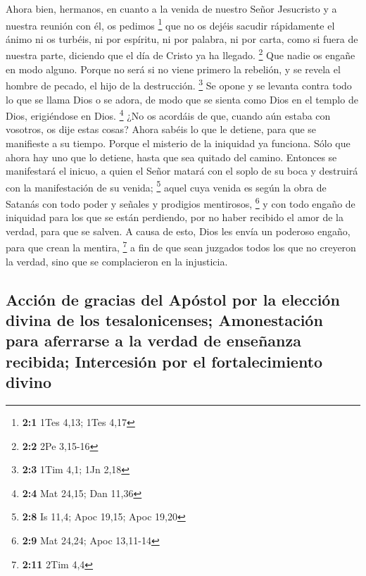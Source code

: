 \begin{paracol}{2}
 Ahora bien, hermanos, en cuanto a la venida de nuestro
Señor Jesucristo y a nuestra reunión con él, os pedimos \footnote{\textbf{2:1}
  1Tes 4,13; 1Tes 4,17}  que no os dejéis sacudir
rápidamente el ánimo ni os turbéis, ni por espíritu, ni por palabra, ni
por carta, como si fuera de nuestra parte, diciendo que el día de Cristo
ya ha llegado. \footnote{\textbf{2:2} 2Pe 3,15-16}  Que
nadie os engañe en modo alguno. Porque no será si no viene primero la
rebelión, y se revela el hombre de pecado, el hijo de la destrucción.
\footnote{\textbf{2:3} 1Tim 4,1; 1Jn 2,18}  Se opone y se
levanta contra todo lo que se llama Dios o se adora, de modo que se
sienta como Dios en el templo de Dios, erigiéndose en Dios. \footnote{\textbf{2:4}
  Mat 24,15; Dan 11,36}  ¿No os acordáis de que, cuando
aún estaba con vosotros, os dije estas cosas?  Ahora
sabéis lo que le detiene, para que se manifieste a su tiempo.
 Porque el misterio de la iniquidad ya funciona. Sólo que
ahora hay uno que lo detiene, hasta que sea quitado del camino.
 Entonces se manifestará el inicuo, a quien el Señor
matará con el soplo de su boca y destruirá con la manifestación de su
venida; \footnote{\textbf{2:8} Is 11,4; Apoc 19,15; Apoc 19,20}
 aquel cuya venida es según la obra de Satanás con todo
poder y señales y prodigios mentirosos, \footnote{\textbf{2:9} Mat
  24,24; Apoc 13,11-14}  y con todo engaño de iniquidad
para los que se están perdiendo, por no haber recibido el amor de la
verdad, para que se salven.  A causa de esto, Dios les
envía un poderoso engaño, para que crean la mentira, \footnote{\textbf{2:11}
  2Tim 4,4}  a fin de que sean juzgados todos los que no
creyeron la verdad, sino que se complacieron en la injusticia.

\hypertarget{acciuxf3n-de-gracias-del-apuxf3stol-por-la-elecciuxf3n-divina-de-los-tesalonicenses-amonestaciuxf3n-para-aferrarse-a-la-verdad-de-enseuxf1anza-recibida-intercesiuxf3n-por-el-fortalecimiento-divino}{%
\subsection{Acción de gracias del Apóstol por la elección divina de los
tesalonicenses; Amonestación para aferrarse a la verdad de enseñanza
recibida; Intercesión por el fortalecimiento
divino}\label{acciuxf3n-de-gracias-del-apuxf3stol-por-la-elecciuxf3n-divina-de-los-tesalonicenses-amonestaciuxf3n-para-aferrarse-a-la-verdad-de-enseuxf1anza-recibida-intercesiuxf3n-por-el-fortalecimiento-divino}}


\end{paracol}
